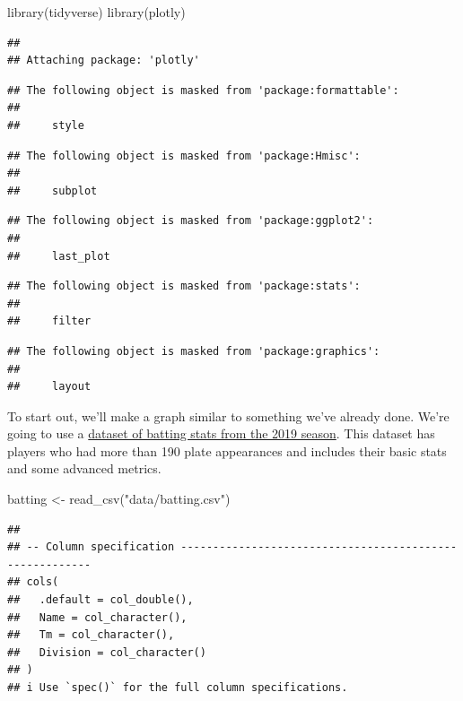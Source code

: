 \documentclass[
]{book}
\newenvironment{Shaded}{\begin{snugshade}}{\end{snugshade}}
\newcommand{\FunctionTok}[1]{\textcolor[rgb]{0.00,0.00,0.00}{#1}}
\newcommand{\NormalTok}[1]{#1}
\newcommand{\OtherTok}[1]{\textcolor[rgb]{0.56,0.35,0.01}{#1}}
\newcommand{\StringTok}[1]{\textcolor[rgb]{0.31,0.60,0.02}{#1}}
\begin{document}
\begin{Shaded}
\begin{Highlighting}[]
\FunctionTok{library}\NormalTok{(tidyverse)}
\FunctionTok{library}\NormalTok{(plotly)}
\end{Highlighting}
\end{Shaded}

\begin{verbatim}
## 
## Attaching package: 'plotly'
\end{verbatim}

\begin{verbatim}
## The following object is masked from 'package:formattable':
## 
##     style
\end{verbatim}

\begin{verbatim}
## The following object is masked from 'package:Hmisc':
## 
##     subplot
\end{verbatim}

\begin{verbatim}
## The following object is masked from 'package:ggplot2':
## 
##     last_plot
\end{verbatim}

\begin{verbatim}
## The following object is masked from 'package:stats':
## 
##     filter
\end{verbatim}

\begin{verbatim}
## The following object is masked from 'package:graphics':
## 
##     layout
\end{verbatim}

To start out, we'll make a graph similar to something we've already done. We're going to use a \href{https://unl.box.com/s/xg0eqvmz9ynnegvjabv21ev5qlsd7mjs}{dataset of batting stats from the 2019 season}. This dataset has players who had more than 190 plate appearances and includes their basic stats and some advanced metrics.

\begin{Shaded}
\begin{Highlighting}[]
\NormalTok{batting }\OtherTok{\textless{}{-}} \FunctionTok{read\_csv}\NormalTok{(}\StringTok{"data/batting.csv"}\NormalTok{)}
\end{Highlighting}
\end{Shaded}

\begin{verbatim}
## 
## -- Column specification --------------------------------------------------------
## cols(
##   .default = col_double(),
##   Name = col_character(),
##   Tm = col_character(),
##   Division = col_character()
## )
## i Use `spec()` for the full column specifications.
\end{verbatim}
\end{document}
